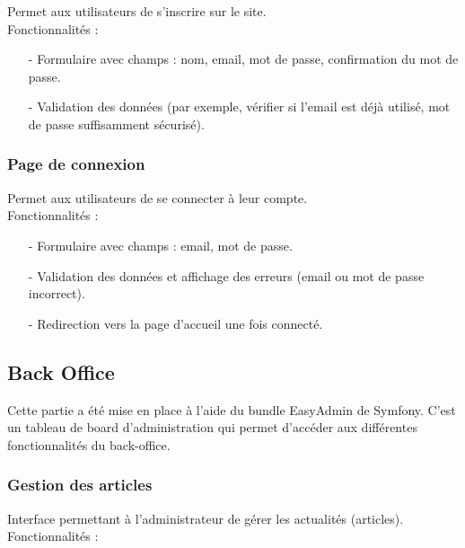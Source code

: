 \documentclass[12pt,a4paper]{article}
\begin{document}
    Permet aux utilisateurs de s’inscrire sur le site.\\

	Fonctionnalités :
    
    \begin{itemize}
    		\item[-] Formulaire avec champs : nom, email, mot de passe, confirmation du mot de passe.
    		\item[-] Validation des données (par exemple, vérifier si l’email est déjà utilisé, mot de passe suffisamment sécurisé).
    \end{itemize}

\subsubsection{Page de connexion}

    Permet aux utilisateurs de se connecter à leur compte.\\
    
    Fonctionnalités :
    
    \begin{itemize}
    		\item[-] Formulaire avec champs : email, mot de passe.
    		\item[-] Validation des données et affichage des erreurs (email ou mot de passe incorrect).
    		\item[-]  Redirection vers la page d'accueil une fois connecté.
    \end{itemize}
        
        

\subsection{Back Office}

Cette partie a été mise en place à l'aide du bundle EasyAdmin de Symfony. C'est un tableau de board d'administration qui permet d'accéder aux différentes fonctionnalités du back-office. \\

\subsubsection{Gestion des articles}

    Interface permettant à l'administrateur de gérer les actualités (articles).\\
    
    Fonctionnalités :
    
\end{document}
